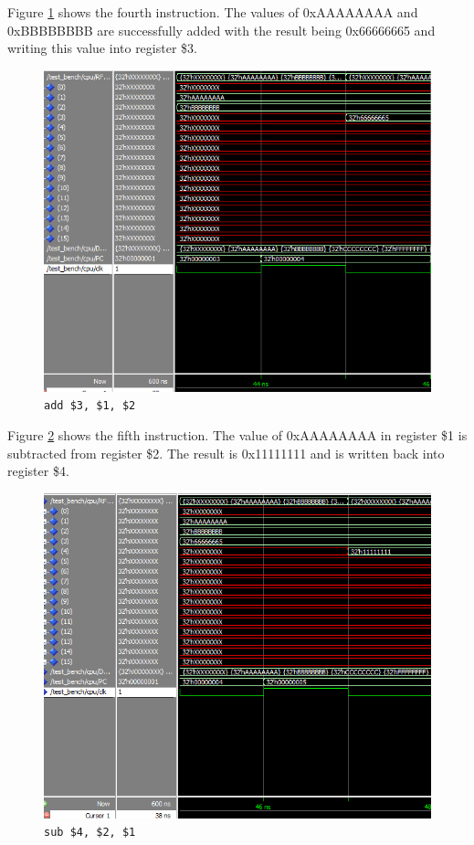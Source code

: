 \documentclass[12pt]{article}
\begin{document}
Figure \ref{fig:4-instr} shows the fourth instruction. The values of 0xAAAAAAAA and 0xBBBBBBBB are successfully added with the result being 0x66666665 and writing this value into register \$3.

\begin{figure}[H]
\centering
\includegraphics[width=\linewidth]{simulation/4-instr}
\caption{\texttt{add \$3, \$1, \$2}}
\label{fig:4-instr}
\end{figure}

Figure \ref{fig:5-instr} shows the fifth instruction. The value of 0xAAAAAAAA in register \$1 is subtracted from register \$2. The result is 0x11111111 and is written back into register \$4.
\begin{figure}[H]
\centering
\includegraphics[width=\linewidth]{simulation/5-instr}
\caption{\texttt{sub \$4, \$2, \$1}}
\label{fig:5-instr}
\end{figure}
\end{document}
